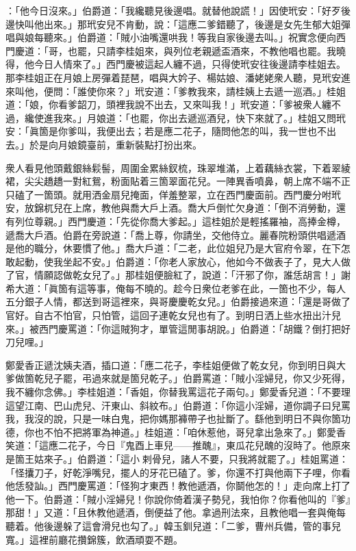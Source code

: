 ：「他今日沒來。」伯爵道：「我纔聽見後邊唱。就替他說謊！」因使玳安：「好歹後邊快叫他出來。」那玳安兒不肯動，說：「這應二爹錯聽了，後邊是女先生郁大姐彈唱與娘每聽來。」伯爵道：「賊小油嘴還哄我！等我自家後邊去叫。」祝實念便向西門慶道：「哥，也罷，只請李桂姐來，與列位老親遞盃酒來，不教他唱也罷。我曉得，他今日人情來了。」西門慶被這起人纏不過，只得使玳安往後邊請李桂姐去。那李桂姐正在月娘上房彈着琵琶，唱與大妗子、楊姑娘、潘姥姥衆人聽，見玳安進來叫他，便問：「誰使你來？」玳安道：「爹教我來，請桂姨上去遞一巡酒。」桂姐道：「娘，你看爹韶刀，頭裡我說不出去，又來叫我！」玳安道：「爹被衆人纏不過，纔使進我來。」月娘道：「也罷，你出去遞巡酒兒，快下來就了。」桂姐又問玳安：「眞箇是你爹叫，我便出去；若是應二花子，隨問他怎的叫，我一世也不出去。」於是向月娘鏡臺前，重新裝點打扮出來。

衆人看見他頭戴銀絲鬏髻，周圍金累絲釵梳，珠翠堆滿，上着藕絲衣裳，下着翠綾裙，尖尖趫趫一對紅鴛，粉面貼着三箇翠面花兒。一陣異香噴鼻，朝上席不端不正只磕了一箇頭。就用洒金扇兒掩面，佯羞整翠，立在西門慶面前。西門慶分咐玳安，放錦杌兒在上席，教他與喬大戶上酒。喬大戶倒忙欠身道：「倒不消勞動，還有列位尊親。」西門慶道：「先從你喬大爹起。」這桂姐於是輕搖羅袖，高捧金樽，遞喬大戶酒。伯爵在旁說道：「喬上尊，你請坐，交他侍立。麗春院粉頭供唱遞酒是他的職分，休要慣了他。」喬大戶道：「二老，此位姐兒乃是大官府令翠，在下怎敢起動，使我坐起不安。」伯爵道：「你老人家放心，他如今不做表子了，見大人做了官，情願認做乾女兒了。」那桂姐便臉紅了，說道：「汗邪了你，誰恁胡言！」謝希大道：「眞箇有這等事，俺每不曉的。趁今日衆位老爹在此，一箇也不少，每人五分銀子人情，都送到哥這裡來，與哥慶慶乾女兒。」{}伯爵接過來道：「還是哥做了官好。自古不怕官，只怕管，這回子連乾女兒也有了。到明日洒上些水扭出汁兒來。」被西門慶罵道：「你這賊狗才，單管這閒事胡說。」伯爵道：「胡鐵？倒打把好刀兒哩。」

鄭愛香正遞沈姨夫酒，插口道：「應二花子，李桂姐便做了乾女兒，你到明日與大爹做箇乾兒子罷，弔過來就是箇兒乾子。」伯爵罵道：「賊小淫婦兒，你又少死得，我不纏你念佛。」李桂姐道：「香姐，你替我罵這花子兩句。」鄭愛香兒道：「不要理這望江南、巴山虎兒、汗東山、斜紋布。」{}伯爵道：「你這小淫婦，道你調子曰兒罵我，我沒的說，只是一味白鬼，把你媽那褲帶子也扯斷了。繇他到明日不與你箇功德，你也不怕不把將軍為神道。」桂姐道：「咱休惹他，哥兒拿出急來了。」鄭愛香笑道：「這應二花子，今日『鬼酉上車兒——推醜』，東瓜花兒醜的沒時了。他原來是箇王姑來子。」伯爵道：「這小𢱉剌骨兒，諸人不要，只我將就罷了。」桂姐罵道：「怪攮刀子，好乾淨嘴兒，擺人的牙花已磕了。爹，你還不打與他兩下子哩，你看他恁發訕。」西門慶罵道：「怪狗才東西！教他遞酒，你鬬他怎的！」走向席上打了他一下。伯爵道：「賊小淫婦兒！你說你倚着漢子勢兒，我怕你？你看他叫的『爹』那甜！」又道：「且休教他遞酒，倒便益了他。拿過刑法來，且教他唱一套與俺每聽着。他後邊躲了這會滑兒也勾了。」韓玉釧兒道：「二爹，曹州兵備，管的事兒寬。」這裡前廳花攢錦簇，飲酒頑耍不題。


